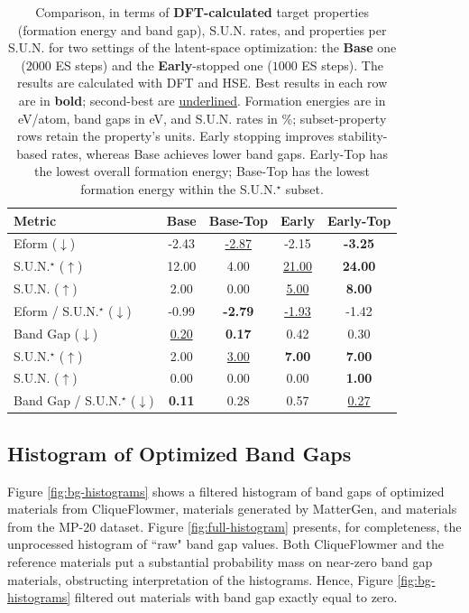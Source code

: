 \documentclass{article}
\theoremstyle{plain}
\theoremstyle{definition}
\theoremstyle{remark}
\begin{document}
\begin{table}[t]
\centering
\caption{Comparison, in terms of \textbf{DFT-calculated} target properties (formation energy and band gap), S.U.N. rates, and properties per S.U.N. for two settings of the latent-space optimization: the \textbf{Base} one ($2000$ ES steps) and the \textbf{Early}-stopped one ($1000$ ES steps). The results are calculated with DFT and HSE. 
Best results in each row are in \textbf{bold}; second-best are \underline{underlined}.
Formation energies are in eV/atom, band gaps in eV, and S.U.N. rates in \%; subset-property rows retain the property's units. Early stopping improves stability-based rates, whereas Base achieves lower band gaps. Early-Top has the lowest overall formation energy; Base-Top has the lowest formation energy within the S.U.N.$^\star$ subset.
}
\label{tab:dft_base_vs_early}
{
\begin{tabular}{l|cc|cc}
\toprule
\textbf{Metric} & Base & Base-Top & Early & Early-Top \\
\midrule
Eform ($\downarrow$) 
    & -2.43 & \underline{-2.87} & -2.15 & \textbf{-3.25} \\
S.U.N.$^\star$ ($\uparrow$) 
    & 12.00 & 4.00 & \underline{21.00} & \textbf{24.00} \\
S.U.N. ($\uparrow$) 
    & 2.00 & 0.00 & \underline{5.00} & \textbf{8.00} \\
Eform / S.U.N.$^\star$ ($\downarrow$) 
    & -0.99 & \textbf{-2.79} & \underline{-1.93} & -1.42 \\
\midrule
Band Gap ($\downarrow$) 
    & \underline{0.20} & \textbf{0.17} & 0.42 & 0.30 \\
S.U.N.$^\star$ ($\uparrow$) 
    & 2.00 & \underline{3.00} & \textbf{7.00} & \textbf{7.00} \\
S.U.N. ($\uparrow$) 
    & 0.00 & 0.00 & 0.00 & \textbf{1.00} \\
Band Gap / S.U.N.$^\star$ ($\downarrow$) 
    & \textbf{0.11} & 0.28 & 0.57 & \underline{0.27} \\
\bottomrule
\end{tabular}
}
\end{table}

\subsection{Histogram of Optimized Band Gaps} 
\label{appendix:histogram}

Figure \ref{fig:bg-histograms} shows a filtered histogram of band gaps of optimized materials from CliqueFlowmer, materials generated by MatterGen, and materials from the MP-20 dataset.
Figure \ref{fig:full-histogram} presents, for completeness, the unprocessed histogram of ``raw" band gap values.
Both CliqueFlowmer and the reference materials put a substantial probability mass on near-zero band gap materials, obstructing interpretation of the histograms. Hence, Figure \ref{fig:bg-histograms} filtered out materials with band gap exactly equal to zero.
\end{document}

